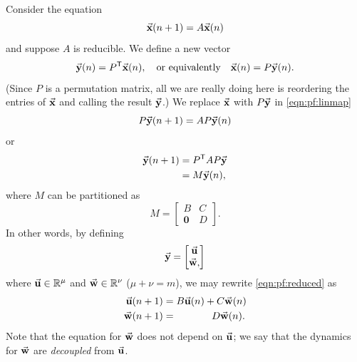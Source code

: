 Consider the equation
\begin{equation}
   \vec{\textbf{x}}(n+1)  = A\vec{\textbf{x}}(n)
\label{eqn:pf:linmap}
\end{equation}
and suppose $A$ is reducible.
We define a new vector
\begin{equation}
  \vec{\textbf{y}}(n) = P^{\textsf{T}}\vec{\textbf{x}}(n), \quad \textrm{or equivalently}\quad
  \vec{\textbf{x}}(n) = P\vec{\textbf{y}}(n).
\end{equation}
(Since $P$ is a permutation matrix, all we are really doing here
is reordering the entries of $\vec{\textbf{x}}$ and calling the result $\vec{\textbf{y}}$.)
We replace $\vec{\textbf{x}}$ with $P\vec{\textbf{y}}$ in \eqref{eqn:pf:linmap}
\begin{equation}
   P\vec{\textbf{y}}(n+1)  = AP\vec{\textbf{y}}(n)
\end{equation}
or
\begin{equation}
\begin{split}
    \vec{\textbf{y}}(n+1) & = P^{\textsf{T}}AP\vec{\textbf{y}} \\
             & = M\vec{\textbf{y}}(n),
\end{split}
\label{eqn:pf:reduced}
\end{equation}
where $M$ can be partitioned as
\begin{equation}
   M = \begin{bmatrix}
            B & C \\
            \textbf{0} & D
       \end{bmatrix}.
\end{equation}
In other words, by defining
\begin{equation}
   \vec{\textbf{y}} = \begin{bmatrix} \vec{\textbf{u}} \\ \vec{\textbf{w}},
         \end{bmatrix}
\end{equation}
where $\vec{\textbf{u}} \in \mathbb{R}^{\mu}$ and $\vec{\textbf{w}} \in \mathbb{R}^{\nu}$ ($\mu+\nu=m$),
we may rewrite
\eqref{eqn:pf:reduced} as
\begin{equation}
\begin{split}
   \vec{\textbf{u}}(n+1) & = B \vec{\textbf{u}}(n) + C \vec{\textbf{w}}(n) \\
   \vec{\textbf{w}}(n+1) & = \quad\quad\quad\;\; D \vec{\textbf{w}}(n).
\end{split}
\end{equation}
Note that the equation for $\vec{\textbf{w}}$ does not depend
on $\vec{\textbf{u}}$; we say that the dynamics for $\vec{\textbf{w}}$
are \emph{decoupled} from $\vec{\textbf{u}}$.

